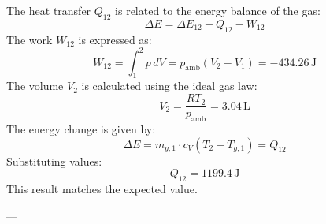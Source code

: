 The heat transfer \( Q_{12} \) is related to the energy balance of the gas:  
\[
\Delta E = \Delta E_{12} + Q_{12} - W_{12}
\]  
The work \( W_{12} \) is expressed as:  
\[
W_{12} = \int_{1}^{2} p \, dV = p_{\text{amb}} (V_2 - V_1) = -434.26 \, \text{J}
\]  
The volume \( V_2 \) is calculated using the ideal gas law:  
\[
V_2 = \frac{R T_2}{p_{\text{amb}}} = 3.04 \, \text{L}
\]  
The energy change is given by:  
\[
\Delta E = m_{g,1} \cdot c_V (T_{2} - T_{g,1}) = Q_{12}
\]  
Substituting values:  
\[
Q_{12} = 1199.4 \, \text{J}
\]  
This result matches the expected value.

---